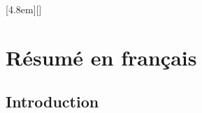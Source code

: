 \documentclass[thesis]{subfiles}
\begin{document}
\begin{otherlanguage}{french}

\renewcommand{\thesection}{\arabic{section}}
\renewcommand{\thesubsection}{\arabic{section}.\arabic{subsection}}
\renewcommand{\thefigure}{R\arabic{figure}}
\setcounter{figure}{0}
[4.8em]{\addvspace{0.1em}}{\contentslabel{2.2em}}{}{\contentspage}[]

\chapter*{Résumé en français}
\startcontents[chapters]
\printpartialtoc

\setcounter{tocdepth}{0}

\section*{Introduction}






\end{otherlanguage}

\OnlyInSubfile{\printglobalbibliography}
\end{document}
